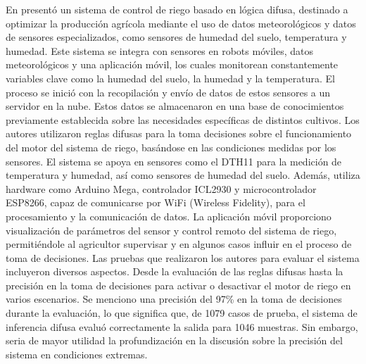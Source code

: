 \bigbreak
En \cite{noauthor_fuzzy_2023} presentó un sistema de control de riego basado en lógica difusa, destinado a optimizar la producción agrícola mediante el uso de datos meteorológicos y datos de sensores especializados, como sensores de humedad del suelo, temperatura y humedad. Este sistema se integra con sensores en robots móviles, datos meteorológicos y una aplicación móvil, los cuales monitorean constantemente variables clave como la humedad del suelo, la humedad y la temperatura. El proceso se inició con la recopilación y envío de datos de estos sensores a un servidor en la nube. Estos datos se almacenaron en una base de conocimientos previamente establecida sobre las necesidades específicas de distintos cultivos. Los autores utilizaron reglas difusas para la toma decisiones sobre el funcionamiento del motor del sistema de riego, basándose en las condiciones medidas por los sensores. El sistema se apoya en sensores como el DTH11 para la medición de temperatura y humedad, así como sensores de humedad del suelo. Además, utiliza hardware como Arduino Mega, controlador ICL2930 y microcontrolador ESP8266, capaz de comunicarse por WiFi (Wireless Fidelity), para el procesamiento y la comunicación de datos. La aplicación móvil proporciono visualización de parámetros del sensor y control remoto del sistema de riego, permitiéndole al agricultor supervisar y en algunos casos influir en el proceso de toma de decisiones. Las pruebas que realizaron los autores para evaluar el sistema incluyeron diversos aspectos. Desde la evaluación de las reglas difusas hasta la precisión en la toma de decisiones para activar o desactivar el motor de riego en varios escenarios. Se menciono una precisión del 97\% en la toma de decisiones durante la evaluación, lo que significa que, de 1079 casos de prueba, el sistema de inferencia difusa evaluó correctamente la salida para 1046 muestras. Sin embargo, seria de mayor utilidad la profundización en la discusión sobre la precisión del sistema en condiciones extremas.

